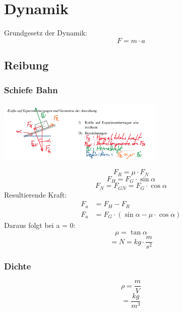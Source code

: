 \documentclass[a4paper]{IEEEtran}
\begin{document}
  \section{Dynamik}
  Grundgesetz der Dynamik:
  \begin{equation}
    F = m \cdot a
  \end{equation}

  \subsection{Reibung}

  \subsubsection{Schiefe Bahn}

  \begin{center}
    \includegraphics[width=8cm]{images/dynamik_schiefe_bahn.png}
  \end{center}
  \begin{equation}
    F_R = \mu \cdot F_N
  \end{equation}
  \begin{equation}
    F_H = F_G \cdot \sin{\alpha}
  \end{equation}
  \begin{equation}
    F_N = F_{GN} = F_{G} \cdot \cos{\alpha}
  \end{equation}
  Resultierende Kraft:
  \begin{align}
    F_a &= F_H - F_R \\
    F_a &= F_G \cdot (\sin{\alpha} - \mu \cdot \cos{\alpha})
  \end{align}
  Daraus folgt bei a = 0:
  \begin{equation}
    \mu = \tan{\alpha}
  \end{equation}
  \begin{equation}
    [F] = N = kg \cdot \frac{m}{s^2}
  \end{equation}

  \subsubsection{Dichte}
  \begin{equation}
    \rho = \frac{m}{V}
  \end{equation}
  \begin{equation}
    [\rho] = \frac{kg}{m^3}
  \end{equation}
\end{document}
